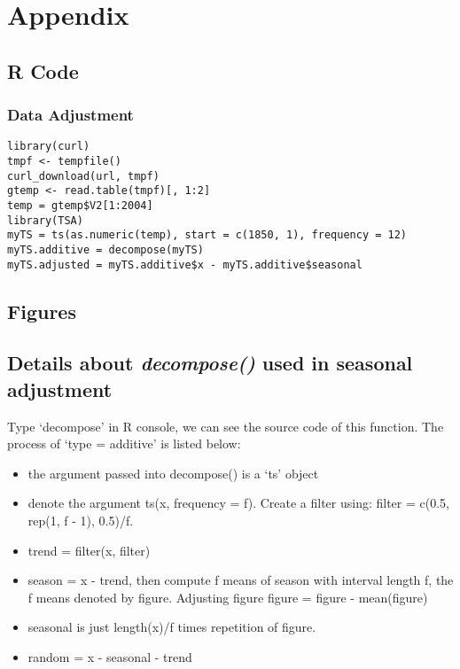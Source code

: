\documentclass[a4paper, 9pt]{article}
\begin{document}
\newpage
\section{Appendix}

\subsection{R Code}
\subsubsection{Data Adjustment}
\begin{verbatim}
library(curl)
tmpf <- tempfile()
curl_download(url, tmpf)
gtemp <- read.table(tmpf)[, 1:2]
temp = gtemp$V2[1:2004]
library(TSA)
myTS = ts(as.numeric(temp), start = c(1850, 1), frequency = 12)
myTS.additive = decompose(myTS)
myTS.adjusted = myTS.additive$x - myTS.additive$seasonal
\end{verbatim}




\subsection{Figures}





\subsection{Details about \textit{decompose()} used in seasonal adjustment}
Type `decompose' in R console, we can see the source code of this function. The process of `type = additive' is listed below:
\begin{itemize}
\item the argument passed into decompose() is a `ts' object 
\item denote the argument ts(x, frequency = f). Create a filter using: filter = c(0.5, rep(1, f - 1), 0.5)/f.
\item trend = filter(x, filter)
\item season = x - trend, then compute f means of season with interval length f, the f means denoted by figure. Adjusting figure figure = figure - mean(figure)
\item seasonal is just length(x)/f times repetition of figure.
\item random = x - seasonal - trend
\end{itemize}
\end{document}
